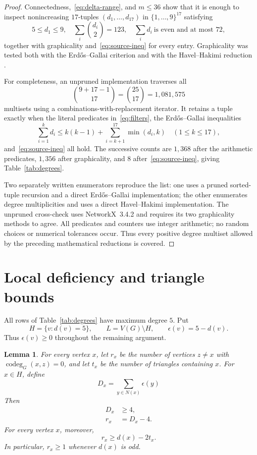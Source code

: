 \documentclass[11pt]{article}
\newtheorem{lemma}[theorem]{Lemma}
\newcommand{\codeg}{\operatorname{codeg}}
\begin{document}
\begin{proof}
Connectedness,~\eqref{eq:delta-range}, and $m\leq36$ show that it is enough
to inspect nonincreasing $17$-tuples $(d_1,\ldots,d_{17})$ in
$\{1,\ldots,9\}^{17}$ satisfying
\begin{equation}\label{eq:filters}
 5\leq d_1\leq9,\quad
 \sum_i\binom{d_i}{2}=123,\quad
 \sum_i d_i\ \text{is even and at most }72,
\end{equation}
together with graphicality and~\eqref{eq:source-ineq} for every entry.
Graphicality was tested both with the Erd\H{o}s--Gallai criterion
\cite{ErdosGallai1960} and with the Havel--Hakimi reduction
\cite{Havel1955,Hakimi1962}.

For completeness, an unpruned implementation traverses all
\[
 \binom{9+17-1}{17}=\binom{25}{17}=1{,}081{,}575
\]
multisets using a combinations-with-replacement iterator.  It retains a
tuple exactly when the literal predicates in~\eqref{eq:filters}, the
Erd\H{o}s--Gallai inequalities
\[
 \sum_{i=1}^k d_i\leq k(k-1)+\sum_{i=k+1}^{17}\min(d_i,k)
 \quad(1\leq k\leq17),
\]
and~\eqref{eq:source-ineq} all hold.  The successive counts are $1{,}368$
after the arithmetic predicates, $1{,}356$ after graphicality, and $8$
after~\eqref{eq:source-ineq}, giving Table~\ref{tab:degrees}.

Two separately written enumerators reproduce the list: one uses a pruned
sorted-tuple recursion and a direct Erd\H{o}s--Gallai implementation; the
other enumerates degree multiplicities and uses a direct Havel--Hakimi
implementation.  The unpruned cross-check uses NetworkX~3.4.2
\cite{HagbergEtAl2008} and requires its two graphicality methods to agree.
All predicates and counters use integer arithmetic; no random choices or
numerical tolerances occur.  Thus every positive degree multiset allowed by
the preceding mathematical reductions is covered.
\end{proof}

\section{Local deficiency and triangle bounds}

All rows of Table~\ref{tab:degrees} have maximum degree $5$.  Put
\[
 H=\{v:d(v)=5\},\qquad L=V(G)\setminus H,
 \qquad \epsilon(v)=5-d(v).
\]
Thus $\epsilon(v)\geq0$ throughout the remaining argument.

\begin{lemma}\label{lem:local}
For every vertex $x$, let $r_x$ be the number of vertices $z\ne x$ with
$\codeg_G(x,z)=0$, and let $t_x$ be the number of triangles containing
$x$.  For $x\in H$, define
\[
 D_x=\sum_{y\in N(x)}\epsilon(y)
\]
Then
\begin{align}
 D_x&\geq4,\label{eq:D-lower}\\
 r_x&=D_x-4.\label{eq:r-exact}
\end{align}
For every vertex $x$, moreover,
\begin{equation}\label{eq:triangle-lower-local}
 r_x\geq d(x)-2t_x.
\end{equation}
In particular, $r_x\geq1$ whenever $d(x)$ is odd.
\end{lemma}
\end{document}
